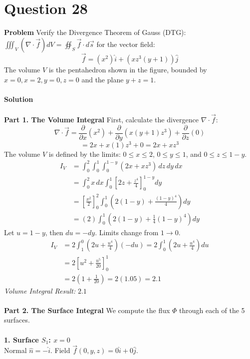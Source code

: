 \documentclass{article}
\begin{document}
\section{Question 28}
\textbf{Problem}
Verify the Divergence Theorem of Gauss (DTG):
$\iiint_V (\nabla \cdot \vec{f}) dV = \oiint_S \vec{f} \cdot d\vec{s}$ for the
vector field:
\[
	\vec{f} = (x^2)\hat{i} + (xz^3(y+1))\hat{j}
\]
The volume $V$ is the pentahedron shown in the figure, bounded by
$x=0, x=2, y=0, z=0$ and the plane $y+z=1$.
\\
\\
\textbf{Solution}
\\
\\
\textbf{Part 1. The Volume Integral}
First, calculate the divergence $\nabla \cdot \vec{f}$:
\[
	\nabla \cdot \vec{f} = \frac{\partial}{\partial x}(x^2) + \frac{\partial}{\partial y}(x(y+1)z^3) + \frac{\partial}{\partial z}(0)
\]
\[
	= 2x + x(1)z^3 + 0 = 2x + xz^3
\]
The volume $V$ is defined by the limits:
$0 \le x \le 2$, $0 \le y \le 1$, and $0 \le z \le 1-y$.
\begin{align*}
	I_V & = \int_0^2 \int_0^1 \int_0^{1-y} (2x + xz^3) \, dz \, dy \, dx                           \\
	    & = \int_0^2 x \, dx \int_0^1 \left[ 2z + \frac{z^4}{4} \right]_0^{1-y} dy                 \\
	    & = \left[ \frac{x^2}{2} \right]_0^2 \int_0^1 \left( 2(1-y) + \frac{(1-y)^4}{4} \right) dy \\
	    & = (2) \int_0^1 \left( 2(1-y) + \frac{1}{4}(1-y)^4 \right) dy
\end{align*}
Let $u = 1-y$, then $du = -dy$. Limits change from $1 \to 0$.
\begin{align*}
	I_V & = 2 \int_1^0 \left( 2u + \frac{u^4}{4} \right) (-du) = 2 \int_0^1 \left( 2u + \frac{u^4}{4} \right) du \\
	    & = 2 \left[ u^2 + \frac{u^5}{20} \right]_0^1                                                            \\
	    & = 2 \left( 1 + \frac{1}{20} \right) = 2(1.05) = 2.1
\end{align*}
\textit{Volume Integral Result:} $2.1$
\\
\\
\textbf{Part 2. The Surface Integral}
We compute the flux $\Phi$ through each of the 5 surfaces.
\\
\\
\textbf{1. Surface $S_1$: $x=0$}
\\
Normal $\hat{n} = -\hat{i}$. Field $\vec{f}(0,y,z) = 0\hat{i} + 0\hat{j}$.
\end{document}
